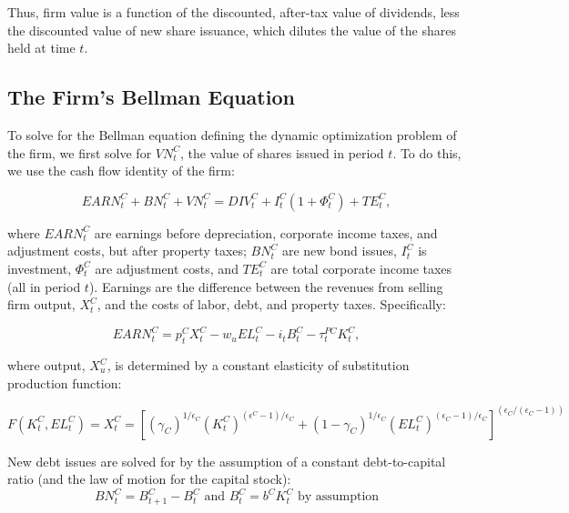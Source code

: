 Thus, firm value is a function of the discounted, after-tax value of dividends, less the discounted value of new share issuance, which dilutes the value of the shares held at time $t$. 

\subsection{The Firm's Bellman Equation}

To solve for the Bellman equation defining the dynamic optimization problem of the firm, we first solve for $VN^{C}_{t}$, the value of shares issued in period $t$.  To do this, we use the cash flow identity of the firm: 

\begin{equation}
\label{eqn:vn}
EARN^{C}_{t}+BN^{C}_{t}+VN^{C}_{t}=DIV^{C}_{t}+I^{C}_{t}(1+\Phi^{C}_{t})+TE^{C}_{t}, 
\end{equation}

where $EARN^{C}_{t}$ are earnings before depreciation, corporate income taxes, and adjustment costs, but after property taxes; $BN^{C}_{t}$ are new bond issues, $I^{C}_{t}$ is investment, $\Phi^{C}_{t}$ are adjustment costs, and $TE^{C}_{t}$ are total corporate income taxes (all in period $t$).  Earnings are the difference between the revenues from selling firm output, $X^{C}_{t}$, and the costs of labor, debt, and property taxes.  Specifically:    

\begin{equation}
\label{eqn:earn}
EARN^{C}_{t}=p^{C}_{t}X^{C}_{t}-w_{u}EL^{C}_{t}-i_{t}B^{C}_{t}-\tau^{PC}_{t}K^{C}_{t},
\end{equation}

\noindent\noindent where output, $X^{C}_{u}$, is determined by a constant elasticity of substitution production function:

\begin{equation}
\label{eqn:prod_fun}
F(K^{C}_{t},EL^{C}_{t})=X^{C}_{t} = \left[(\gamma_{C})^{1/\epsilon_{C}}(K^{C}_{t})^{(\epsilon^{C}-1)/\epsilon_{C}}+(1-\gamma_{C})^{1/\epsilon_{C}}(EL^{C}_{t})^{(\epsilon_{C}-1)/\epsilon_{C}}\right]^{(\epsilon_{C}/(\epsilon_{C}-1))}
\end{equation}

New debt issues are solved for by the assumption of a constant debt-to-capital ratio (and the law of motion for the capital stock):
\begin{equation}
\label{eqn:debt}
BN^{C}_{t}=B^{C}_{t+1} - B^{C}_{t} \text{ and } B^{C}_{t}=b^{C}K^{C}_{t} \text{ by assumption} 
\end{equation}

